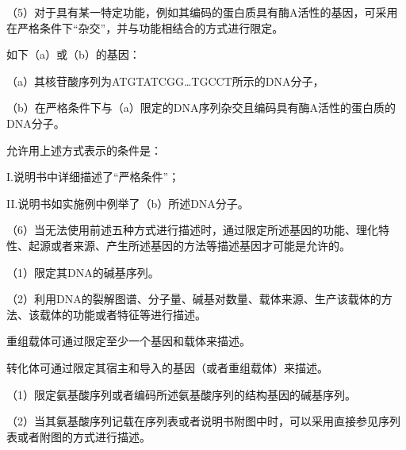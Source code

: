 {\setlength{\parindent}{17.1bp}（5）对于具有某一特定功能，例如其编码的蛋白质具有酶A活性的基因，可采用在严格条件下“杂交”，并与功能相结合的方式进行限定。\par}

{\par}

如下（a）或（b）的基因：

{\setlength{\parindent}{17.1bp}（a）其核苷酸序列为ATGTATCGG…TGCCT所示的DNA分子，\par}

{\setlength{\parindent}{17.1bp}（b）在严格条件下与（a）限定的DNA序列杂交且编码具有酶A活性的蛋白质的DNA分子。\par}

允许用上述方式表示的条件是：

I.说明书中详细描述了“严格条件”；

II.说明书如实施例中例举了（b）所述DNA分子。

{\setlength{\parindent}{17.1bp}（6）当无法使用前述五种方式进行描述时，通过限定所述基因的功能、理化特性、起源或者来源、产生所述基因的方法等描述基因才可能是允许的。\par}

{\setlength{\parindent}{17.1bp}（1）限定其DNA的碱基序列。\par}

{\setlength{\parindent}{17.1bp}（2）利用DNA的裂解图谱、分子量、碱基对数量、载体来源、生产该载体的方法、该载体的功能或者特征等进行描述。\par}

重组载体可通过限定至少一个基因和载体来描述。

{\setlength{\parindent}{21.4bp}转化体可通过限定其宿主和导入的基因（或者重组载体）来描述。\par}

{\setlength{\parindent}{17.1bp}（1）限定氨基酸序列或者编码所述氨基酸序列的结构基因的碱基序列。\par}

{\setlength{\parindent}{17.1bp}（2）当其氨基酸序列记载在序列表或者说明书附图中时，可以采用直接参见序列表或者附图的方式进行描述。\par}

{\par}


